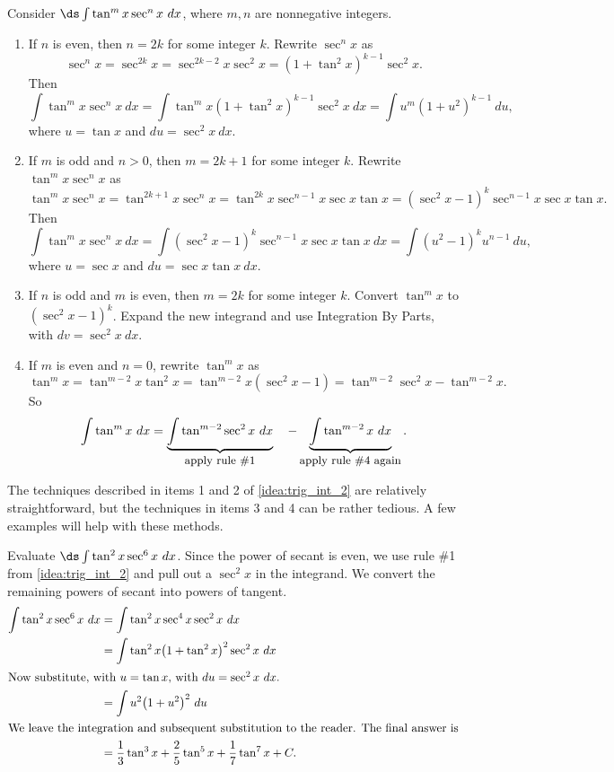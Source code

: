 {
\begin{keyidea}\label{idea:trig_int_2}
Consider $\ds\int\tan^mx\sec^nx\ dx$, where $m,n$ are nonnegative integers.
\begin{enumerate}
\item		If $n$ is even, then $n=2k$ for some integer $k$. Rewrite $\sec^nx$ as 
\[\sec^nx = \sec^{2k}x = \sec^{2k-2}x\sec^2x = (1+\tan^2x)^{k-1}\sec^2x.\]
Then
\[
\int\tan^mx\sec^nx\ dx=\int\tan^mx(1+\tan^2x)^{k-1}\sec^2x\ dx = \int u^m(1+u^2)^{k-1}\ du,
\]
where $u = \tan x$ and $du = \sec^2x\ dx$.

\item		If $m$ is odd and $n>0$, then $m=2k+1$ for some integer $k$. Rewrite $\tan^mx\sec^nx$ as
\[
\tan^mx\sec^nx = \tan^{2k+1}x\sec^nx = \tan^{2k}x\sec^{n-1}x\sec x\tan x = (\sec^2x-1)^k\sec^{n-1}x\sec x\tan x.
\]
Then
\[
\int\tan^mx\sec^nx\ dx=\int(\sec^2x-1)^k\sec^{n-1}x\sec x\tan x\ dx = \int(u^2-1)^ku^{n-1}\ du,
\]
where $u = \sec x$ and $du = \sec x\tan x\ dx$.

\item If $n$ is odd and $m$ is even, then $m=2k$ for some integer $k$. Convert $\tan^mx $ to $(\sec^2x-1)^k$. Expand the new integrand and use Integration By Parts, with $dv = \sec^2x\ dx$.

\item		If $m$ is even and $n=0$, rewrite $\tan^mx$ as
\[
\tan^mx = \tan^{m-2}x\tan^2x = \tan^{m-2}x(\sec^2x-1) = \tan^{m-2}\sec^2x-\tan^{m-2}x.
\]
So
\[
\int\tan^mx\ dx = \underbrace{\int\tan^{m-2}\sec^2x\ dx}_{\text{\small apply rule \#1}}\quad - \underbrace{\int\tan^{m-2}x\ dx}_{\text{\small apply rule \#4 again}}.
\]

\end{enumerate}
\end{keyidea}
}

The techniques described in items 1 and 2 of \autoref{idea:trig_int_2} are relatively straightforward, but the techniques in items 3 and 4 can be rather tedious. A few examples will help with these methods.

\begin{example}\label{ex_trigint5}
Evaluate $\ds\int \tan^2x\sec^6x\ dx$.
\solution
Since the power of secant is even, we use rule \#1 from \autoref{idea:trig_int_2} and pull out a $\sec^2x$ in the integrand. We convert the remaining powers of secant into powers of tangent.
\begin{align*}
\int \tan^2x\sec^6x\ dx &= \int\tan^2x\sec^4x\sec^2x\ dx \\
		&= \int \tan^2x\bigl(1+\tan^2x\bigr)^2\sec^2x\ dx \\
\intertext{Now substitute, with $u=\tan x$, with $du = \sec^2x\ dx$.}
		&=\int u^2\bigl(1+u^2\bigr)^2\ du\\
\intertext{We leave the integration and subsequent substitution to the reader. The final answer is}
		&=\frac13\tan^3x+\frac25\tan^5x+\frac17\tan^7x+C.
\end{align*}
\end{example}

